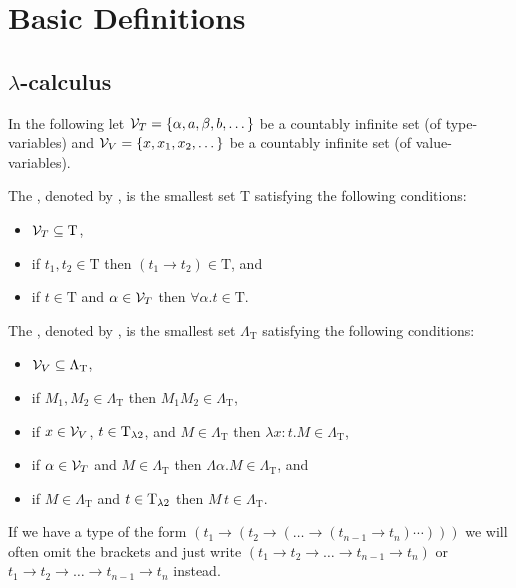 \section{Basic Definitions}
\subsection{$\lambda$-calculus \lambdaTwo}
In the following let $\mathcal{V}_T=\{\alpha,a,\beta,b,\dots\}$ be a countably infinite set (of type-variables) and $\mathcal{V}_V=\{x,x_1,x_2,\dots\}$ be a countably infinite set (of value-variables).
\begin{definition}
	The , denoted by \lambdaTypes{}, is the smallest set T satisfying the following conditions: %
	\begin{itemize}
		\item $\mathcal{V}_T\subseteq\text{T}$,
		\item if $t_1,t_2\in\text{T}$ then $(t_1\to t_2)\in\text{T}$, and
		\item if $t\in\text{T}$ and $\alpha\in\mathcal{V}_T$ then $\forall\alpha.t\in\text{T}$.
	\end{itemize}
	
	The , denoted by \lambdaTerms{}, is the smallest set $\Lambda_\text{T}$ satisfying the following conditions: %
	\begin{itemize}
		\item $\mathcal{V}_V\subseteq\Lambda_\text{T}$,
		\item if $M_1,M_2\in\Lambda_\text{T}$ then $M_1M_2\in\Lambda_\text{T}$,
		\item if $x\in\mathcal{V}_V$, $t\in\text{T}_{\lambda2}$, and $M\in\Lambda_\text{T}$ then $\lambda x:t.M\in\Lambda_\text{T}$,
		\item if $\alpha\in\mathcal{V}_T$ and $M\in\Lambda_\text{T}$ then $\Lambda \alpha.M\in\Lambda_\text{T}$, and
		\item if $M\in\Lambda_\text{T}$ and $t\in\text{T}_{\lambda2}$ then $M\,t\in\Lambda_\text{T}$.
	\end{itemize}
\end{definition}
If we have a type of the form $(t_1\to(t_2\to(\dots \to(t_{n-1}\to t_n)\cdots)))$ we will often omit the brackets and just write $(t_1\to t_2\to\dots\to t_{n-1}\to t_n)$ or $t_1\to t_2\to\dots \to t_{n-1}\to t_n$ instead. %
